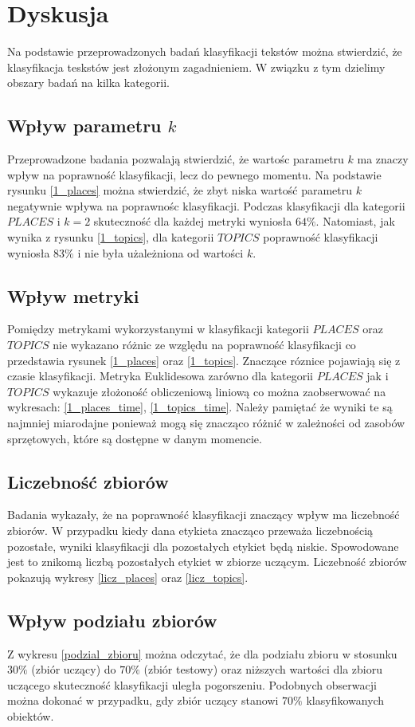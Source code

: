 \documentclass{classrep}
\begin{document}
\section{Dyskusja}
Na podstawie przeprowadzonych badań klasyfikacji tekstów można stwierdzić, że klasyfikacja teskstów
jest złożonym zagadnieniem. W związku z tym dzielimy obszary badań na kilka kategorii.

\subsection{Wpływ parametru $k$}
Przeprowadzone badania pozwalają stwierdzić, że wartośc parametru $k$ ma znaczy wpływ na poprawność
klasyfikacji, lecz do pewnego momentu. Na podstawie rysunku \ref{1_places} można stwierdzić, że
zbyt niska wartość parametru $k$ negatywnie wpływa na poprawnośc klasyfikacji. Podczas klasyfikacji
dla kategorii $PLACES$ i $k=2$ skuteczność dla każdej metryki wyniosła $64\%$. Natomiast, jak wynika
z rysunku \ref{1_topics}, dla
kategorii $TOPICS$ poprawność klasyfikacji wyniosła $83\%$ i nie była użależniona od wartości $k$.


\subsection{Wpływ metryki}
Pomiędzy metrykami wykorzystanymi w klasyfikacji kategorii $PLACES$ oraz $TOPICS$ nie wykazano
różnic ze względu na
poprawność klasyfikacji co przedstawia rysunek \ref{1_places} oraz \ref{1_topics}. Znaczące róznice
pojawiają się z czasie klasyfikacji. Metryka Euklidesowa zarówno dla kategorii $PLACES$ jak i $TOPICS$
wykazuje złożoność obliczeniową liniową co można zaobserwować na wykresach: \ref{1_places_time},
\ref{1_topics_time}. Należy pamiętać że wyniki te są najmniej miarodajne ponieważ mogą się znacząco
różnić w zależności od zasobów sprzętowych, które są dostępne w danym momencie.

\subsection{Liczebność zbiorów}
Badania wykazały, że na poprawność klasyfikacji znaczący wpływ ma liczebność zbiorów. W przypadku
kiedy dana etykieta znacząco przeważa liczebnością pozostałe, wyniki klasyfikacji dla pozostałych
etykiet będą niskie. Spowodowane jest to znikomą liczbą pozostałych etykiet w zbiorze uczącym.
Liczebność zbiorów pokazują wykresy \ref{licz_places} oraz \ref{licz_topics}.

\subsection{Wpływ podziału zbiorów}
Z wykresu \ref{podzial_zbioru} można odczytać, że dla podziału zbioru w
stosunku $30\%$ (zbiór uczący) do $70\%$ (zbiór testowy) oraz niższych wartości dla zbioru uczącego
skuteczność klasyfikacji uległa pogorszeniu. Podobnych obserwacji można dokonać w przypadku, gdy
zbiór uczący stanowi $70\%$
klasyfikowanych obiektów.
\end{document}
